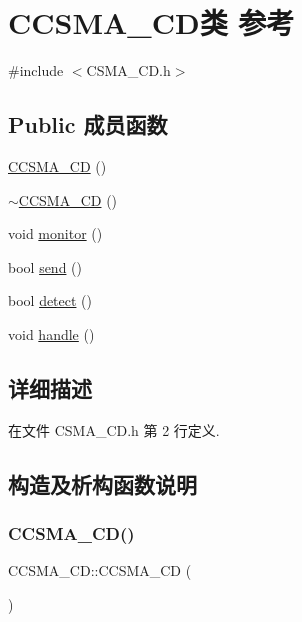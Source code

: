 \hypertarget{class_c_c_s_m_a___c_d}{}\section{C\+C\+S\+M\+A\+\_\+\+C\+D类 参考}
\label{class_c_c_s_m_a___c_d}


{\ttfamily \#include $<$C\+S\+M\+A\+\_\+\+C\+D.\+h$>$}

\subsection*{Public 成员函数}
\begin{DoxyCompactItemize}
\item 
\hyperlink{class_c_c_s_m_a___c_d_a3558c5e07b179d60c2fc133bebee8e21}{C\+C\+S\+M\+A\+\_\+\+CD} ()
\item 
\hyperlink{class_c_c_s_m_a___c_d_a3b936d9a48b0c4d593f0bbff54761cbe}{$\sim$\+C\+C\+S\+M\+A\+\_\+\+CD} ()
\item 
void \hyperlink{class_c_c_s_m_a___c_d_a270a833b070a834dbf2c1f997ea85ee6}{monitor} ()
\item 
bool \hyperlink{class_c_c_s_m_a___c_d_a630a99c3ee32298d8c217a3fc2e2d65c}{send} ()
\item 
bool \hyperlink{class_c_c_s_m_a___c_d_a152628ee66959e6a2594250f51148be4}{detect} ()
\item 
void \hyperlink{class_c_c_s_m_a___c_d_a5ace5c0de3305086cd7ee31e6f601cd3}{handle} ()
\end{DoxyCompactItemize}


\subsection{详细描述}


在文件 C\+S\+M\+A\+\_\+\+C\+D.\+h 第 2 行定义.



\subsection{构造及析构函数说明}
\mbox{\label{class_c_c_s_m_a___c_d_a3558c5e07b179d60c2fc133bebee8e21}} 
\subsubsection{\texorpdfstring{C\+C\+S\+M\+A\+\_\+\+C\+D()}{CCSMA\_CD()}}
{\footnotesize\ttfamily C\+C\+S\+M\+A\+\_\+\+C\+D\+::\+C\+C\+S\+M\+A\+\_\+\+CD (\begin{DoxyParamCaption}{ }\end{DoxyParamCaption})}



